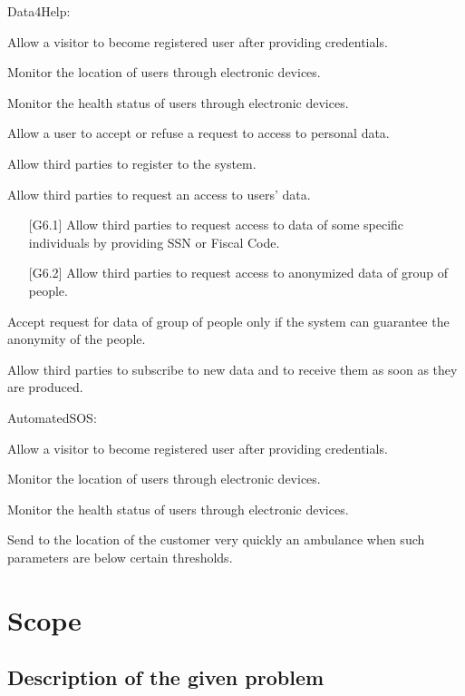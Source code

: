 Data4Help:  
\begin{enumerate}[label={[G\arabic*]}]
    \item Allow a visitor to become registered user after providing credentials.
    \item Monitor the location of users through electronic devices.
    \item Monitor the health status of users through electronic devices.
    \item Allow a user to accept or refuse a request to access to personal data.
    \item Allow third parties to register to the system.
    \item Allow third parties to request an access to users' data.
    \begin{enumerate} %
        \item [{[G6.1]}] Allow third parties to request access to data of some specific individuals by providing SSN or Fiscal Code.
        \item [{[G6.2]}] Allow third parties to request access to anonymized data of group of people.
    \end{enumerate}
    \item Accept request for data of group of people only if the system can guarantee the anonymity of the people.
    \item Allow third parties to subscribe to new data and to receive them as soon as they are produced.
\end{enumerate}  
\noindent
AutomatedSOS:
\begin{enumerate}[resume, label={[G\arabic*]}]
    \item Allow a visitor to become registered user after providing credentials.
    \item Monitor the location of users through electronic devices.
    \item Monitor the health status of users through electronic devices.
    \item Send to the location of the customer very quickly an ambulance when such parameters are below certain thresholds. 
\end{enumerate}

\section{Scope}
\subsection{Description of the given problem}

